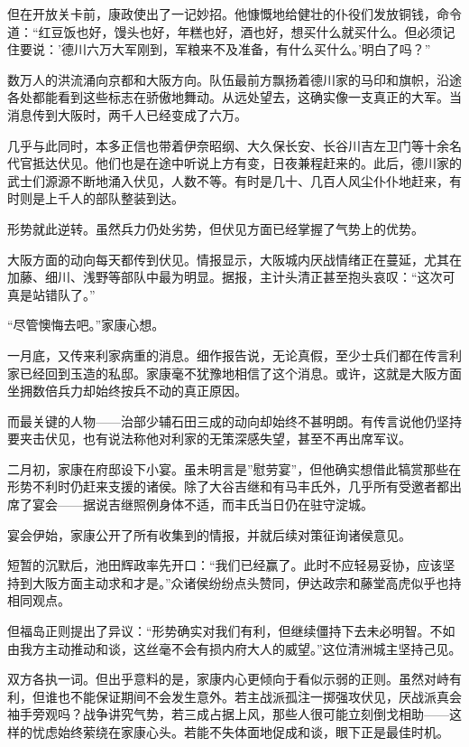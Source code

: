 \documentclass[
]{book}
\begin{document}
但在开放关卡前，康政使出了一记妙招。他慷慨地给健壮的仆役们发放铜钱，命令道：``红豆饭也好，馒头也好，年糕也好，酒也好，想买什么就买什么。但必须记住要说：'德川六万大军刚到，军粮来不及准备，有什么买什么。'明白了吗？''

数万人的洪流涌向京都和大阪方向。队伍最前方飘扬着德川家的马印和旗帜，沿途各处都能看到这些标志在骄傲地舞动。从远处望去，这确实像一支真正的大军。当消息传到大阪时，两千人已经变成了六万。

几乎与此同时，本多正信也带着伊奈昭纲、大久保长安、长谷川吉左卫门等十余名代官抵达伏见。他们也是在途中听说上方有变，日夜兼程赶来的。此后，德川家的武士们源源不断地涌入伏见，人数不等。有时是几十、几百人风尘仆仆地赶来，有时则是上千人的部队整装到达。

形势就此逆转。虽然兵力仍处劣势，但伏见方面已经掌握了气势上的优势。

大阪方面的动向每天都传到伏见。情报显示，大阪城内厌战情绪正在蔓延，尤其在加藤、细川、浅野等部队中最为明显。据报，主计头清正甚至抱头哀叹：``这次可真是站错队了。''

``尽管懊悔去吧。''家康心想。

一月底，又传来利家病重的消息。细作报告说，无论真假，至少士兵们都在传言利家已经回到玉造的私邸。家康毫不犹豫地相信了这个消息。或许，这就是大阪方面坐拥数倍兵力却始终按兵不动的真正原因。

而最关键的人物------治部少辅石田三成的动向却始终不甚明朗。有传言说他仍坚持要夹击伏见，也有说法称他对利家的无策深感失望，甚至不再出席军议。

二月初，家康在府邸设下小宴。虽未明言是''慰劳宴''，但他确实想借此犒赏那些在形势不利时仍赶来支援的诸侯。除了大谷吉继和有马丰氏外，几乎所有受邀者都出席了宴会------据说吉继照例身体不适，而丰氏当日仍在驻守淀城。

宴会伊始，家康公开了所有收集到的情报，并就后续对策征询诸侯意见。

短暂的沉默后，池田辉政率先开口：``我们已经赢了。此时不应轻易妥协，应该坚持到大阪方面主动求和才是。''众诸侯纷纷点头赞同，伊达政宗和藤堂高虎似乎也持相同观点。

但福岛正则提出了异议：``形势确实对我们有利，但继续僵持下去未必明智。不如由我方主动推动和谈，这丝毫不会有损内府大人的威望。''这位清洲城主坚持己见。

双方各执一词。但出乎意料的是，家康内心更倾向于看似示弱的正则。虽然对峙有利，但谁也不能保证期间不会发生意外。若主战派孤注一掷强攻伏见，厌战派真会袖手旁观吗？战争讲究气势，若三成占据上风，那些人很可能立刻倒戈相助------这样的忧虑始终萦绕在家康心头。若能不失体面地促成和谈，眼下正是最佳时机。
\end{document}
